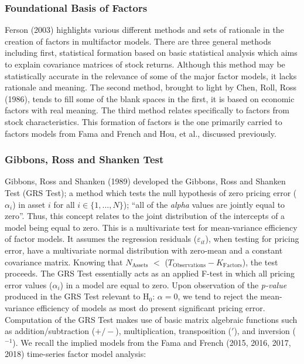 \documentclass[11pt, english]{article}
\begin{document}
		\subsubsection*{Foundational Basis of Factors}
	
	Ferson (2003) highlights various different methods and sets of rationale in the creation of factors in multifactor models. There are three general methods including first, statistical formation based on basic statistical analysis which aims to explain covariance matrices of stock returns. Although this method may be statistically accurate in the relevance of some of the major factor models, it lacks rationale and meaning. The second method, brought to light by Chen, Roll, Ross (1986), tends to fill some of the blank spaces in the first, it is based on economic factors with real meaning. The third method relates specifically to factors from stock characteristics. This formation of factors is the one primarily carried to factors models from Fama and French and Hou, et al., discussed previously.

		\subsubsection*{Gibbons, Ross and Shanken Test}

	Gibbons, Ross and Shanken (1989) developed the Gibbons, Ross and Shanken Test (GRS Test); a method which tests the null hypothesis of zero pricing error ($\alpha_i$) in asset $i$ for all $i\in\{1,...,N\}$); ``all of the \textit{alpha} values are jointly equal to zero''. Thus, this concept relates to the joint distribution of the intercepts of a model being equal to zero. This is a multivariate test for mean-variance efficiency of factor models. It assumes the regression residuals ($\varepsilon_{it}$), when testing for pricing error, have a multivariate normal distribution with zero-mean and a constant covariance matrix. Knowing that $N\mathrm{_{Assets}}$ $<$ ($T\mathrm{_{Observations}}-K\mathrm{_{Factors}}$), the test proceeds. The GRS Test essentially acts as an applied F-test in which all pricing error values ($\alpha_i$) in a model are equal to zero. Upon observation of the \textit{p-value} produced in the GRS Test relevant to H$_0$: $\alpha=0$, we tend to reject the mean-variance efficiency of models as most do present significant pricing error.\\

	Computation of the GRS Test makes use of basic matrix algebraic functions such as addition/subtraction ($+/-$), multiplication, transposition ($'$), and inversion ($^{-1}$). We recall the implied models from the Fama and French (2015, 2016, 2017, 2018) time-series factor model analysis:
\end{document}
